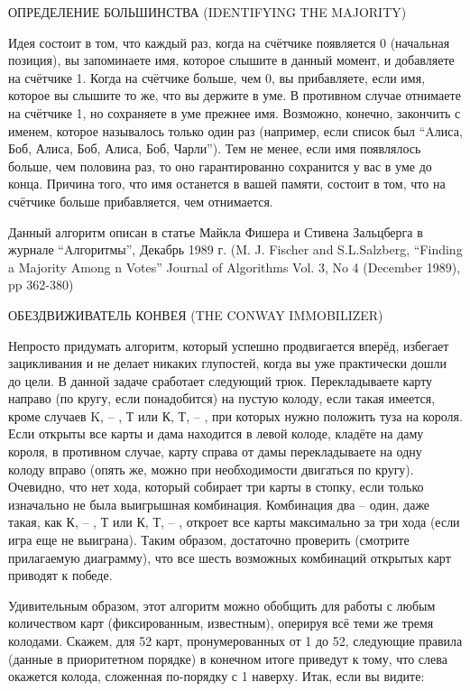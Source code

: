 ﻿ОПРЕДЕЛЕНИЕ БОЛЬШИНСТВА (IDENTIFYING THE MAJORITY)


Идея состоит в том, что каждый раз, когда на счётчике появляется 0 (начальная позиция), 
вы запоминаете имя, которое слышите в данный момент, и добавляете на счётчике 1. Когда на счётчике больше, чем 0, вы прибавляете, если имя, которое вы слышите  то же, что вы держите в уме.  В противном случае отнимаете на счётчике 1, но сохраняете в уме прежнее имя.
    Возможно, конечно, закончить с именем, которое называлось только один раз (например, если список был “Aлиса, Боб, Алиса, Боб, Алиса, Боб, Чарли”).  Тем не менее, если имя появлялось больше, чем половина раз, то оно гарантированно сохранится у вас в уме до конца. Причина того, что имя останется в вашей памяти, состоит в том, что на счётчике больше прибавляется, чем отнимается.


  Данный алгоритм описан в статье Майкла Фишера и Стивена Зальцберга в журнале “Aлгоритмы”, Декабрь 1989 г. (M. J. Fischer and S.L.Salzberg, “Finding a Majority Among n Votes” Journal of Algorithms Vol. 3, No 4 (December 1989), pp 362-380)


ОБЕЗДВИЖИВАТЕЛЬ КОНВЕЯ (THE CONWAY IMMOBILIZER)


 Непросто придумать алгоритм, который успешно продвигается вперёд, избегает зацикливания и не делает никаких глупостей, когда вы уже практически дошли до цели.
В данной задаче сработает следующий трюк. 
     Перекладываете карту направо (по кругу, если понадобится) на пустую колоду, если такая имеется,  кроме случаев  K, -- , Т или К, Т, -- , при которых нужно положить туза на короля. Если открыты все карты и дама находится в левой колоде, кладёте на даму короля, в противном случае,  карту справа от дамы перекладываете на одну колоду вправо (опять же, можно при необходимости двигаться по кругу).
   Очевидно, что нет хода, который собирает три карты в стопку, если только изначально не была выигрышная комбинация. Комбинация два -- один, даже такая, как К, -- , Т или
К, Т, -- ,  откроет все карты максимально за три хода (если игра еще не выиграна). Таким образом, достаточно проверить (смотрите прилагаемую диаграмму), что все шесть возможных комбинаций открытых карт приводят к победе.


   Удивительным образом, этот алгоритм можно обобщить для работы с любым количеством карт (фиксированным, известным), оперируя всё теми же тремя колодами.
Скажем, для  52 карт, пронумерованных от 1 до 52, следующие правила (данные в приоритетном порядке) в конечном итоге приведут к тому, что слева окажется колода, сложенная по-порядку с 1 наверху.  
Итак, если вы видите:
  
